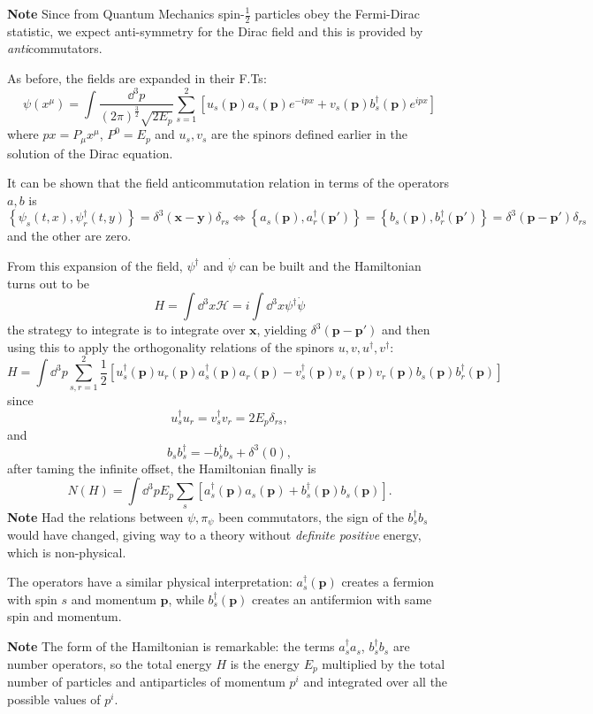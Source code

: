 
\textbf{Note} Since from Quantum Mechanics spin-$\frac{1}{2}$ particles obey
the Fermi-Dirac statistic, we expect anti-symmetry for the Dirac field and this
is provided by \textit{anti}commutators.

As before, the fields are expanded in their F.Ts:
$$\psi(x^\mu) = \int \frac{\dd^3p}{(2\pi)^{\frac{3}{2}}\sqrt{2E_p}}
\sum_{s=1}^{2}\left[u_s(\mathbf{p})a_s(\mathbf{p})e^{-ipx} +
   v_s(\mathbf{p}) b_s^\dagger(\mathbf{p})e^{ipx}
\right]
$$
where $px = P_\mu x^\mu$, $P^0=E_p$ and $u_s,v_s$ are the spinors defined earlier
in the solution of the Dirac equation.

It can be shown that the field anticommutation relation in terms of the
operators $a,b$ is
$$\left\{\psi_s(t,x),\psi_r^\dagger(t,y)\right\}=\delta^3(\mathbf{x-y})\delta_{rs}
\iff
\left\{a_s(\mathbf{p}),a_r^\dagger(\mathbf{p'})\right\}
=\left\{b_s(\mathbf{p}),b_r^\dagger(\mathbf{p'})\right\}=\delta^3(\mathbf{p-p'})
\delta_{rs}
$$
and the other are zero.

From this expansion of the field, $\psi^\dagger$ and $\dot\psi$ can be built
and the Hamiltonian turns out to be
$$H = \int \dd^3x \mathcal{H} = i\int \dd^3x\psi^\dagger\dot\psi$$
the strategy to integrate is to integrate over $\mathbf{x}$, yielding 
$\delta^3(\mathbf{p-p'})$ and then using this to apply the orthogonality relations
of the spinors $u,v,u^\dagger,v^\dagger$:
$$H = \int \dd^3p \sum_{s,r = 1}^{2} \frac{1}{2}\left[u_s^\dagger(\mathbf{p})
u_r(\mathbf{p})a_s^\dagger(\mathbf{p})a_r(\mathbf{p}) - 
v_s^\dagger(\mathbf{p})v_s(\mathbf{p})v_r(\mathbf{p})b_s(\mathbf{p})b_r^\dagger(
\mathbf{p})\right]$$
since
$$u^\dagger_s u_r =  v_s^\dagger v_r=2E_p\delta_{rs},$$and
$$ b_sb_s^\dagger = -b_s^\dagger b_s + \delta^3(0), $$
after taming the infinite offset, the Hamiltonian finally is
$$N(H) = \int \dd^3p E_p \sum_{s}^{}\left[a_s^\dagger(\mathbf{p})a_s(\mathbf{p})
+b_s^\dagger(\mathbf{p})b_s(\mathbf{p})\right].$$
\textbf{Note} Had the relations between $\psi,\pi_\psi$ been commutators,
the sign of the $b^\dagger_sb_s$ would have changed, giving way to a theory
without \textit{definite positive} energy, which is non-physical.

The operators have a similar physical interpretation: $a_s^\dagger(\mathbf{p})$
creates a fermion with spin $s$ and momentum $\mathbf{p}$, while
$b^\dagger_s(\mathbf{p})$ creates an antifermion with same spin and momentum.

\textbf{Note} The form of the Hamiltonian is remarkable: the terms
$a_s^\dagger a_s$, $b_s^\dagger b_s$ are number operators, so the total energy 
$H$ is the energy $E_p$ multiplied by the total number of particles and
antiparticles of momentum $p^i$ and integrated over all the possible values of
$p^i$.

